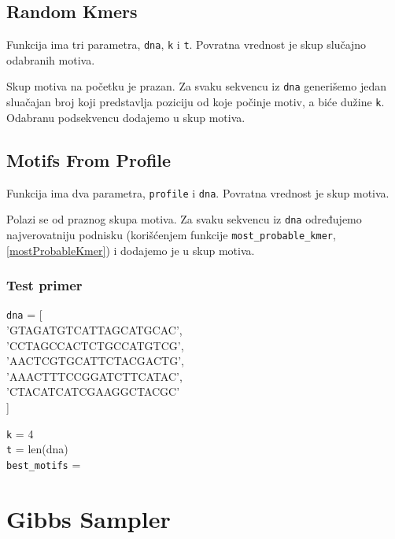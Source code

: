 

\subsection{Random Kmers}
\label{randomKmers}

Funkcija ima tri parametra, \texttt{dna}, \texttt{k} i \texttt{t}. Povratna vrednost je skup slučajno odabranih motiva. 

Skup motiva na početku je prazan. Za svaku sekvencu iz \texttt{dna} generišemo jedan sluačajan broj koji predstavlja poziciju od koje počinje motiv, a biće dužine \texttt{k}. Odabranu podsekvencu dodajemo u skup motiva.



\subsection{Motifs From Profile}
\label{motifsFromProfile}

Funkcija ima dva parametra, \texttt{profile} i \texttt{dna}. Povratna vrednost je skup motiva.

Polazi se od praznog skupa motiva. Za svaku sekvencu iz \texttt{dna} određujemo najverovatniju podnisku (korišćenjem funkcije \texttt{most\_probable\_kmer}, \ref{mostProbableKmer}) i dodajemo je u skup motiva.



\subsubsection{Test primer}
\noindent\texttt{dna} = [ \\
'GTAGATGTCATTAGCATGCAC', \\
'CCTAGCCACTCTGCCATGTCG', \\
'AACTCGTGCATTCTACGACTG', \\
'AAACTTTCCGGATCTTCATAC', \\
'CTACATCATCGAAGGCTACGC' \\
]

\noindent \texttt{k} = 4
\\\texttt{t} = len(dna)
\\\texttt{best\_motifs} =

\section{Gibbs Sampler}

